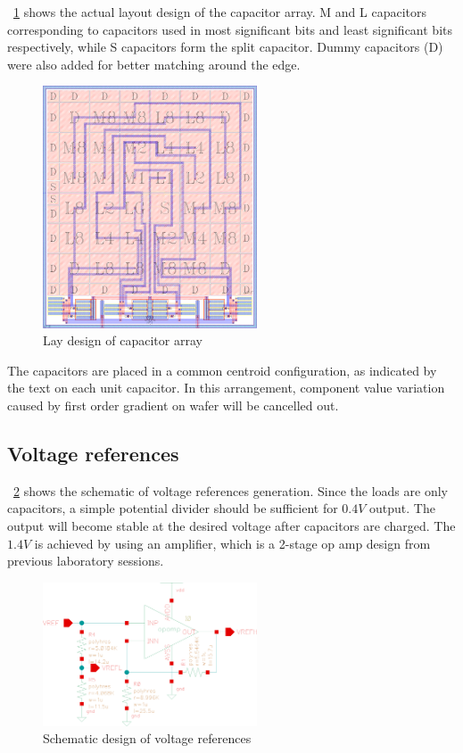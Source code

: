 \documentclass[journal]{IEEEtran}
\newcommand{\fref}[1]{\figurename~\ref{#1}}
\begin{document}
\fref{fig_cap_lay} shows the actual layout design of the capacitor array. M and L capacitors corresponding to capacitors used in most significant bits and least significant bits respectively, while S capacitors form the split capacitor. Dummy capacitors (D) were also added for better matching around the edge.

\begin{figure}[!t]
	\centering
	\includegraphics[width=2.5in]{cap_lay_4x}
	\caption{Lay design of capacitor array}
	\label{fig_cap_lay}
\end{figure}

The capacitors are placed in a common centroid configuration, as indicated by the text on each unit capacitor. In this arrangement, component value variation caused by first order gradient on wafer will be cancelled out.

\subsection{Voltage references}

\fref{fig_ref_sch} shows the schematic of voltage references generation. Since the loads are only capacitors, a simple potential divider should be sufficient for $0.4 V$ output. The output will become stable at the desired voltage after capacitors are charged. The $1.4 V$ is achieved by using an amplifier, which is a 2-stage op amp design from previous laboratory sessions.

\begin{figure}[!t]
	\centering
	\includegraphics[width=2.5in]{ref_sch}
	\caption{Schematic design of voltage references}
	\label{fig_ref_sch}
\end{figure}
\end{document}
